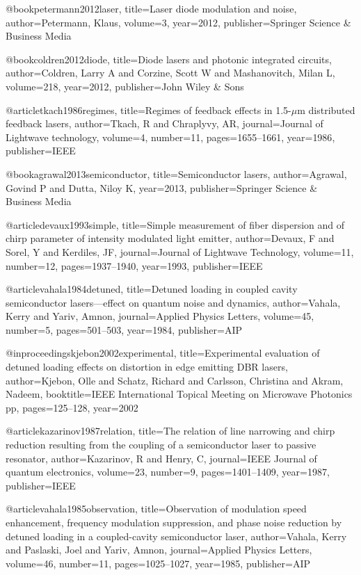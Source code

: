 @book{petermann2012laser,
  title={Laser diode modulation and noise},
  author={Petermann, Klaus},
  volume={3},
  year={2012},
  publisher={Springer Science \& Business Media}
}

@book{coldren2012diode,
  title={Diode lasers and photonic integrated circuits},
  author={Coldren, Larry A and Corzine, Scott W and Mashanovitch, Milan L},
  volume={218},
  year={2012},
  publisher={John Wiley \& Sons}
}

@article{tkach1986regimes,
  title={Regimes of feedback effects in 1.5-$\mu$m distributed feedback lasers},
  author={Tkach, R and Chraplyvy, AR},
  journal={Journal of Lightwave technology},
  volume={4},
  number={11},
  pages={1655--1661},
  year={1986},
  publisher={IEEE}
}


@book{agrawal2013semiconductor,
  title={Semiconductor lasers},
  author={Agrawal, Govind P and Dutta, Niloy K},
  year={2013},
  publisher={Springer Science \& Business Media}
}

@article{devaux1993simple,
  title={Simple measurement of fiber dispersion and of chirp parameter of intensity modulated light emitter},
  author={Devaux, F and Sorel, Y and Kerdiles, JF},
  journal={Journal of Lightwave Technology},
  volume={11},
  number={12},
  pages={1937--1940},
  year={1993},
  publisher={IEEE}
}

@article{vahala1984detuned,
  title={Detuned loading in coupled cavity semiconductor lasers—effect on quantum noise and dynamics},
  author={Vahala, Kerry and Yariv, Amnon},
  journal={Applied Physics Letters},
  volume={45},
  number={5},
  pages={501--503},
  year={1984},
  publisher={AIP}
}

@inproceedings{kjebon2002experimental,
  title={Experimental evaluation of detuned loading effects on distortion in edge emitting DBR lasers},
  author={Kjebon, Olle and Schatz, Richard and Carlsson, Christina and Akram, Nadeem},
  booktitle={IEEE International Topical Meeting on Microwave Photonics pp},
  pages={125--128},
  year={2002}
}

@article{kazarinov1987relation,
  title={The relation of line narrowing and chirp reduction resulting from the coupling of a semiconductor laser to passive resonator},
  author={Kazarinov, R and Henry, C},
  journal={IEEE Journal of quantum electronics},
  volume={23},
  number={9},
  pages={1401--1409},
  year={1987},
  publisher={IEEE}
}

@article{vahala1985observation,
  title={Observation of modulation speed enhancement, frequency modulation suppression, and phase noise reduction by detuned loading in a coupled-cavity semiconductor laser},
  author={Vahala, Kerry and Paslaski, Joel and Yariv, Amnon},
  journal={Applied Physics Letters},
  volume={46},
  number={11},
  pages={1025--1027},
  year={1985},
  publisher={AIP}
}

